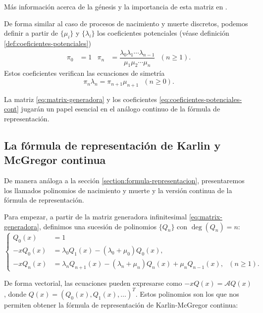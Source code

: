     Más información acerca de la génesis y la importancia de esta matriz en \cite[Section 2.1]{schoutens-2000}.

    De forma similar al caso de procesos de nacimiento y muerte discretos, podemos definir a partir de $\{\mu_i\}$ y $\{\lambda_i\}$ los coeficientes potenciales (véase definición \ref{def:coeficientes-potenciales})
    \begin{align}
        \label{eq:coeficientes-potenciales-cont}
        \pi_0&= 1 & \pi_n &= \dfrac{\lambda_0 \lambda_1 \cdots \lambda_{n-1}}{\mu_1 \mu_2 \cdots \mu_n} \ \ \ (n\geq 1).
    \end{align}
    Estos coeficientes verifican las ecuaciones de simetría
    \begin{equation}
        \label{eq:ecs-simetria-cont}
        \pi_n \lambda_n = \pi_{n+1}\mu_{n+1} \ \ \ (n\geq 0).
    \end{equation} 

    La matriz \eqref{eq:matrix-generadora} y los coeficientes \eqref{eq:coeficientes-potenciales-cont} jugarán un papel esencial en el análogo continuo de la fórmula de representación.

    \subsection{La fórmula de representación de Karlin y McGregor continua}

    De manera análoga a la sección \ref{section:formula-representacion}, presentaremos los llamados polinomios de nacimiento y muerte y la versión continua de la fórmula de representación.

    Para empezar, a partir de la matriz generadora infinitesimal \eqref{eq:matrix-generadora}, definimos una sucesión de polinomios $\{Q_n\}$ con $\deg(Q_n)=n$:
    \begin{equation}
        \label{eq:polinomios-pnm-cont}
        \left\{\begin{aligned}
            Q_{0}(x) &= 1 \\
            -xQ_0(x)&=\lambda_0 Q_1(x) -(\lambda_0 + \mu_0) Q_0(x), \\
            -x Q_n(x) &= \lambda_n Q_{n+1}(x) -(\lambda_n+\mu_n) Q_n(x) + \mu_n Q_{n-1}(x), \ \ \ (n\geq 1).
        \end{aligned}\right.
    \end{equation}

    De forma vectorial, las ecuaciones pueden expresarse como $-x Q(x)=\mathcal{A} Q(x)$, donde $Q(x)=(Q_0(x), Q_1(x),\dots)^T$. Estos polinomios son los que nos permiten obtener la fórmula de representación de Karlin-McGregor continua:

